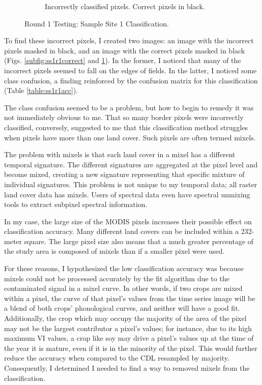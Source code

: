 \begin{Spacing}{1.2}
\begin{figure}
\begin{subfigure}[b]{.475\textwidth}
    \caption{Incorrectly classified pixels. Correct pixels in black.}
    \label{subfig:ss1r1incorrect}
  \end{subfigure}
  \caption{Round 1 Testing: Sample Site 1 Classification.}
  \label{fig:ss1r1class}
\end{figure}
\end{Spacing}

To find these incorrect pixels, I created two images: an image with the incorrect pixels masked in black, and an image with the correct pixels masked in black (Figs. \ref{subfig:ss1r1correct} and \ref{subfig:ss1r1incorrect}). In the former, I noticed that many of the incorrect pixels seemed to fall on the edges of fields. In the latter, I noticed some class confusion, a finding reinforced by the confusion matrix for this classification (Table \ref{table:ss1r1acc}).

The class confusion seemed to be a problem, but how to begin to remedy it was not immediately obvious to me. That so many border pixels were incorrectly classified, conversely, suggested to me that this classification method struggles when pixels have more than one land cover. Such pixels are often termed mixels.

The problem with mixels is that each land cover in a mixel has a different temporal signature. The different signatures are aggregated at the pixel level and become mixed, creating a new signature representing that specific mixture of individual signatures. This problem is not unique to my temporal data; all raster land cover data has mixels. Users of spectral data even have spectral unmixing tools to extract subpixel spectral information. 

In my case, the large size of the MODIS pixels increases their possible effect on classification accuracy. Many different land covers can be included within a 232-meter square. The large pixel size also means that a much greater percentage of the study area is composed of mixels than if a smaller pixel were used.

For these reasons, I hypothesized the low classification accuracy was because mixels could not be processed accurately by the fit algorithm due to the contaminated signal in a mixel curve. In other words, if two crops are mixed within a pixel, the curve of that pixel’s values from the time series image will be a blend of both crops’ phonological curves, and neither will have a good fit. Additionally, the crop which may occupy the majority of the area of the pixel may not be the largest contributor a pixel’s values; for instance, due to its high maximum VI values, a crop like soy may drive a pixel’s values up at the time of the year it is mature, even if it is in the minority of the pixel. This would further reduce the accuracy when compared to the CDL resampled by majority. Consequently, I determined I needed to find a way to removed mixels from the classification.

